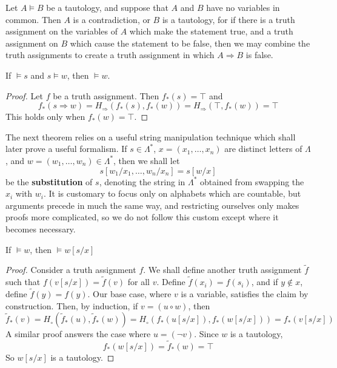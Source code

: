 \begin{example}
    Let $A \vDash B$ be a tautology, and suppose that $A$ and $B$ have no variables in common. Then $A$ is a contradiction, or $B$ is a tautology, for if there is a truth assignment on the variables of $A$ which make the statement true, and a truth assignment on $B$ which cause the statement to be false, then we may combine the truth assignments to create a truth assignment in which $A \Rightarrow B$ is false.
\end{example}

\begin{theorem}
    If $\vDash s$ and $s \vDash w$, then $\vDash w$.
\end{theorem}
\begin{proof}
    Let $f$ be a truth assignment. Then $f_*(s) = \top$ and
    \[ f_*(s \Rightarrow w) = H_\Rightarrow(f_*(s),f_*(w)) = H_\Rightarrow(\top, f_*(w)) = \top \]
    This holds only when $f_*(w) = \top$.
\end{proof}

The next theorem relies on a useful string manipulation technique which shall later prove a useful formalism. If $s \in \Lambda^*$, $x = (x_1, \dots, x_n)$ are distinct letters of $\Lambda$, and $w = (w_1, \dots, w_n) \in \Lambda^*$, then we shall let
%
\[ s[w_1/x_1, \dots, w_n/x_n] = s[w/x] \]
%
be the {\bf substitution} of $s$, denoting the string in $\Lambda^*$ obtained from swapping the $x_i$ with $w_i$. It is customary to focus only on alphabets which are countable, but arguments precede in much the same way, and restricting ourselves only makes proofs more complicated, so we do not follow this custom except where it becomes necessary.

\begin{theorem}
    If $\vDash w$, then $\vDash w[s/x]$
\end{theorem}
\begin{proof}
    Consider a truth assignment $f$. We shall define another truth assignment $\tilde{f}$ such that $f(v[s/x]) = \tilde{f}(v)$ for all $v$. Define $\tilde{f}(x_i) = f(s_i)$, and if $y \not \in x$, define $\tilde{f}(y) = f(y)$. Our base case, where $v$ is a variable, satisfies the claim by construction. Then, by induction, if $v = (u \circ w)$, then
    \[ \tilde{f}_*(v) = H_\circ(\tilde{f}_*(u), \tilde{f}_*(w)) = H_\circ(f_*(u[s/x]), f_*(w[s/x])) = f_*(v[s/x]) \]
    A similar proof answers the case where $u = (\neg v)$. Since $w$ is a tautology,
    \[ f_*(w[s/x]) = \tilde{f}_*(w) = \top \]
    So $w[s/x]$ is a tautology.
\end{proof}

